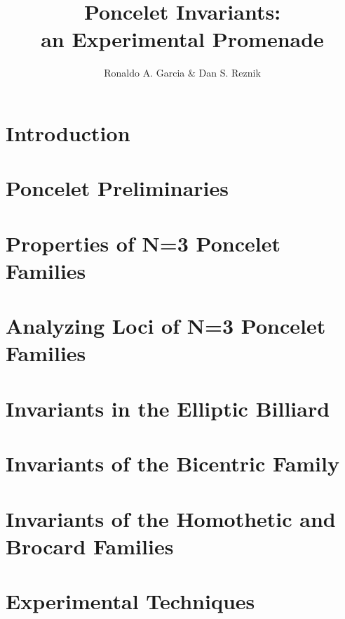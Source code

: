 \documentclass{book}
\begin{document}
\title{Poncelet Invariants:\\an Experimental Promenade}
\author{Ronaldo A. Garcia \& Dan S. Reznik} 
\maketitle

\chapter{Introduction}
\label{chap:01-intro}


\chapter{Poncelet Preliminaries}
\label{chap:02-prelims}
 

\chapter{Properties of N=3 Poncelet Families}
\label{chap:03-n3-properties}


\chapter{Analyzing Loci of N=3 Poncelet Families}
\label{chap:04-n3-loci}


\chapter[Billiard Invariants]{Invariants in the Elliptic Billiard}
\label{chap:05-billiard}

\chapter[Bicentric Invariants]{Invariants of the Bicentric Family}
\label{chap:06-bicentric}
%

\chapter[Homothetic and Brocard Invariants]{Invariants of the Homothetic and Brocard Families}
\label{chap:07-homoth}
%

\chapter{Experimental Techniques}
\label{chap:08-experimental}
%
\end{document}
